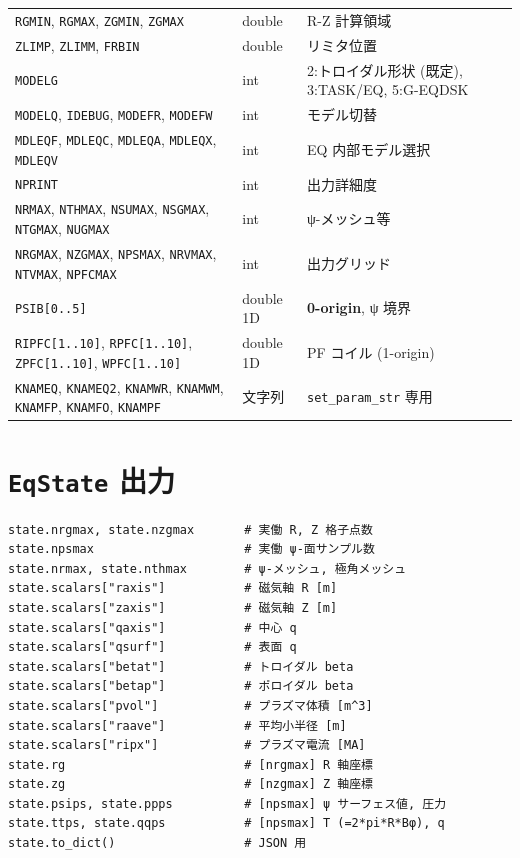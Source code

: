 \documentclass[11pt,a4paper]{report}
\begin{document}
\begin{longtable}{@{}p{3.3cm}p{2.2cm}p{9cm}@{}}
\texttt{RGMIN}, \texttt{RGMAX}, \texttt{ZGMIN}, \texttt{ZGMAX} & double & R-Z 計算領域 \\
\texttt{ZLIMP}, \texttt{ZLIMM}, \texttt{FRBIN} & double & リミタ位置 \\
\texttt{MODELG}                              & int   & 2:トロイダル形状 (既定), 3:TASK/EQ, 5:G-EQDSK \\
\texttt{MODELQ}, \texttt{IDEBUG}, \texttt{MODEFR}, \texttt{MODEFW} & int & モデル切替 \\
\texttt{MDLEQF}, \texttt{MDLEQC}, \texttt{MDLEQA}, \texttt{MDLEQX}, \texttt{MDLEQV} & int & EQ 内部モデル選択 \\
\texttt{NPRINT}                              & int   & 出力詳細度 \\
\texttt{NRMAX}, \texttt{NTHMAX}, \texttt{NSUMAX}, \texttt{NSGMAX}, \texttt{NTGMAX}, \texttt{NUGMAX} & int & ψ-メッシュ等 \\
\texttt{NRGMAX}, \texttt{NZGMAX}, \texttt{NPSMAX}, \texttt{NRVMAX}, \texttt{NTVMAX}, \texttt{NPFCMAX} & int & 出力グリッド \\
\texttt{PSIB[0..5]}                          & double 1D & \textbf{0-origin}, ψ 境界 \\
\texttt{RIPFC[1..10]}, \texttt{RPFC[1..10]}, \texttt{ZPFC[1..10]}, \texttt{WPFC[1..10]} & double 1D & PF コイル (1-origin) \\
\texttt{KNAMEQ}, \texttt{KNAMEQ2}, \texttt{KNAMWR}, \texttt{KNAMWM}, \texttt{KNAMFP}, \texttt{KNAMFO}, \texttt{KNAMPF} & 文字列 & \texttt{set\_param\_str} 専用 \\
\bottomrule
\end{longtable}

\section{\texttt{EqState} 出力}

\begin{lstlisting}[style=py]
state.nrgmax, state.nzgmax       # 実働 R, Z 格子点数
state.npsmax                     # 実働 ψ-面サンプル数
state.nrmax, state.nthmax        # ψ-メッシュ, 極角メッシュ
state.scalars["raxis"]           # 磁気軸 R [m]
state.scalars["zaxis"]           # 磁気軸 Z [m]
state.scalars["qaxis"]           # 中心 q
state.scalars["qsurf"]           # 表面 q
state.scalars["betat"]           # トロイダル beta
state.scalars["betap"]           # ポロイダル beta
state.scalars["pvol"]            # プラズマ体積 [m^3]
state.scalars["raave"]           # 平均小半径 [m]
state.scalars["ripx"]            # プラズマ電流 [MA]
state.rg                         # [nrgmax] R 軸座標
state.zg                         # [nzgmax] Z 軸座標
state.psips, state.ppps          # [npsmax] ψ サーフェス値, 圧力
state.ttps, state.qqps           # [npsmax] T (=2*pi*R*Bφ), q
state.to_dict()                  # JSON 用
\end{lstlisting}
\end{document}
